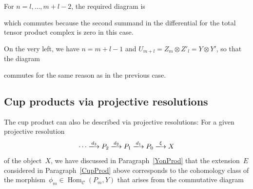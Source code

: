 \documentclass[12pt]{article}
\makeatletter
\theoremstyle{definition}
\theoremstyle{break}
\renewenvironment{proof}[1][\proofname]{\par
\vspace{-5pt}%
\pushQED{\qed}%
\normalfont
\topsep0pt \partopsep0pt %
\trivlist
\item[\hskip\labelsep
\bfseries
#1\@addpunct{.}]\ignorespaces
}{%
\popQED\endtrivlist\@endpefalse
\addvspace{6pt plus 6pt} %
}
\newcommand{\CC}{\mathcal{C}}
\DeclareMathOperator\Hom{Hom}
\DeclareMathOperator\id{id}
\renewcommand{\1}{\mathbbm{1}}
\newcommand{\ot}{\mathbin{\otimes}}
\makeatother
\begin{document}
\begin{proof}
\begin{parlist}
\item
For $n=l,\ldots,m+l-2$, the required diagram is
\begin{center}
\end{center}
which commutes because the second summand in the differential for the total tensor product complex is zero in this case.

\item
On the very left, we have $n=m+l-1$ and $U_{m+l} = Z_{m} \ot Z'_{l} = Y \ot Y'$, so that the diagram
\begin{center}
\end{center}
commutes for the same reason as in the previous case.
\qedhere
\end{parlist}
\end{proof}


\subsection{Cup products via projective resolutions} \label{CupProdRes}
The cup product can also be described via projective resolutions: For a given projective resolution
\[\cdots \xlongrightarrow{d_3} P_2 \xlongrightarrow{d_2} P_1 \xlongrightarrow{d_1} P_0
\xlongrightarrow{\xi} X\]
of the object~$X$, we have discussed in Paragraph~\ref{YonProd} that the extension~$E$ considered in Paragraph~\ref{CupProd} above corresponds to the cohomology class of the
morphism~\mbox{$\phi_m \in \Hom_{\CC}(P_m,Y)$} that arises from the commutative diagram
\begin{center}
\end{center}
\end{document}
